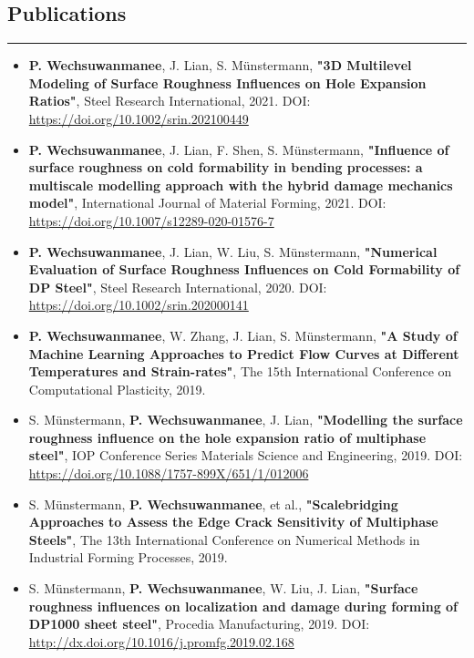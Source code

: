 \subsection*{Publications}
\hrule
\vspace*{0.2cm}
\begin{itemize}
    \item
    \textbf{P. Wechsuwanmanee}, J. Lian, S. Münstermann, \textbf{"3D Multilevel Modeling of Surface Roughness Influences on Hole Expansion Ratios"}, Steel Research International, 2021. DOI: \url{https://doi.org/10.1002/srin.202100449}
    
    \item
    \textbf{P. Wechsuwanmanee}, J. Lian, F. Shen, S. Münstermann, \textbf{"Influence of surface roughness on cold formability in bending processes: a multiscale modelling approach with the hybrid damage mechanics model"}, International Journal of Material Forming, 2021. DOI: \url{https://doi.org/10.1007/s12289-020-01576-7}
    
    \item
    \textbf{P. Wechsuwanmanee}, J. Lian, W. Liu, S. Münstermann, \textbf{"Numerical Evaluation of Surface Roughness Influences on Cold Formability of DP Steel"}, Steel Research International, 2020. DOI: \url{https://doi.org/10.1002/srin.202000141}
    
    \item
    \textbf{P. Wechsuwanmanee}, W. Zhang, J. Lian, S. Münstermann, \textbf{"A Study of Machine Learning Approaches to Predict Flow Curves at Different Temperatures and Strain-rates"}, The 15th International Conference on Computational Plasticity, 2019. 
    
    \item
    S. Münstermann, \textbf{P. Wechsuwanmanee}, J. Lian, \textbf{"Modelling the surface roughness influence on the hole expansion ratio of multiphase steel"}, IOP Conference Series Materials Science and Engineering, 2019. DOI: \url{https://doi.org/10.1088/1757-899X/651/1/012006}
    
    \item
    S. Münstermann, \textbf{P. Wechsuwanmanee}, et al., \textbf{"Scalebridging Approaches to Assess the Edge Crack Sensitivity of Multiphase Steels"}, The 13th International Conference on Numerical Methods in Industrial Forming Processes, 2019.
    
    \item
    S. Münstermann, \textbf{P. Wechsuwanmanee}, W. Liu, J. Lian, \textbf{"Surface roughness influences on localization and damage during forming of DP1000 sheet steel"}, Procedia Manufacturing, 2019. DOI: \url{http://dx.doi.org/10.1016/j.promfg.2019.02.168}
    

\end{itemize}
